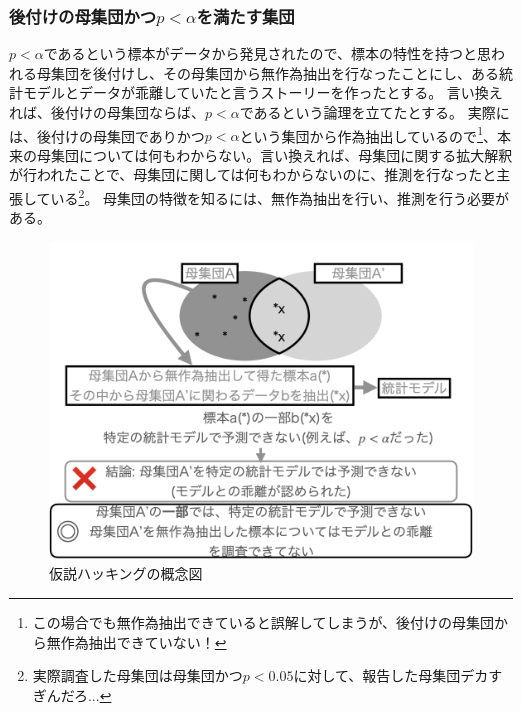 \subsubsection{後付けの母集団かつ$p<\alpha$を満たす集団}
$p<\alpha$であるという標本がデータから発見されたので、標本の特性を持つと思われる母集団を後付けし、その母集団から無作為抽出を行なったことにし、ある統計モデルとデータが乖離していたと言うストーリーを作ったとする。
言い換えれば、後付けの母集団ならば、$p<\alpha$であるという論理を立てたとする。
実際には、後付けの母集団でありかつ$p<\alpha$という集団から作為抽出しているので\footnote{この場合でも無作為抽出できていると誤解してしまうが、後付けの母集団から無作為抽出できていない！}、本来の母集団については何もわからない。言い換えれば、母集団に関する拡大解釈が行われたことで、母集団に関しては何もわからないのに、推測を行なったと主張している\footnote{実際調査した母集団は母集団かつ$p<0.05$に対して、報告した母集団デカすぎんだろ...}。
母集団の特徴を知るには、無作為抽出を行い、推測を行う必要がある。

\begin{figure}
    \begin{center}
        \includegraphics[width=15cm]{./image/01_/conceptual_diagram/conceptual_diagram.005.png}
        \caption{仮説ハッキングの概念図}
        \label{fig:conceptual_diagram_HARKing}
    \end{center}
\end{figure}
    

